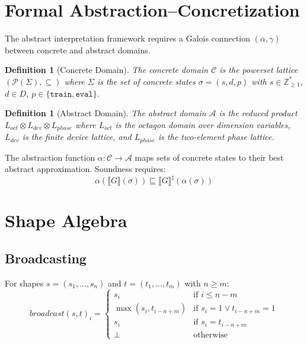 \documentclass[11pt]{article}
\newtheorem{definition}[theorem]{Definition}
\begin{document}
\section{Formal Abstraction--Concretization}\label{app:galois}

The abstract interpretation framework requires a Galois connection
$(\alpha, \gamma)$ between concrete and abstract domains.

\begin{definition}[Concrete Domain]
The concrete domain $\mathcal{C}$ is the powerset lattice
$(\mathcal{P}(\Sigma), \subseteq)$ where $\Sigma$ is the set
of concrete states $\sigma = (s, d, p)$ with $s \in \mathbb{Z}_{\geq 1}^*$,
$d \in D$, $p \in \{\texttt{train}, \texttt{eval}\}$.
\end{definition}

\begin{definition}[Abstract Domain]
The abstract domain $\mathcal{A}$ is the reduced product
$L_{\mathit{oct}} \otimes L_{\mathit{dev}} \otimes L_{\mathit{phase}}$
where $L_{\mathit{oct}}$ is the octagon domain over dimension variables,
$L_{\mathit{dev}}$ is the finite device lattice, and $L_{\mathit{phase}}$
is the two-element phase lattice.
\end{definition}

The abstraction function $\alpha : \mathcal{C} \to \mathcal{A}$
maps sets of concrete states to their best abstract approximation.
Soundness requires:
\[
  \alpha(\llbracket G \rrbracket(\sigma)) \sqsubseteq
  \llbracket G \rrbracket^\sharp(\alpha(\sigma))
\]




\section{Shape Algebra}\label{app:shapes}

\subsection{Broadcasting}
For shapes $s = (s_1, \ldots, s_n)$ and $t = (t_1, \ldots, t_m)$
with $n \geq m$:
\[
  \mathit{broadcast}(s, t)_i = \begin{cases}
    s_i & \text{if } i \leq n - m \\
    \max(s_i, t_{i-n+m}) & \text{if } s_i = 1 \lor t_{i-n+m} = 1 \\
    s_i & \text{if } s_i = t_{i-n+m} \\
    \bot & \text{otherwise}
  \end{cases}
\]
\end{document}
